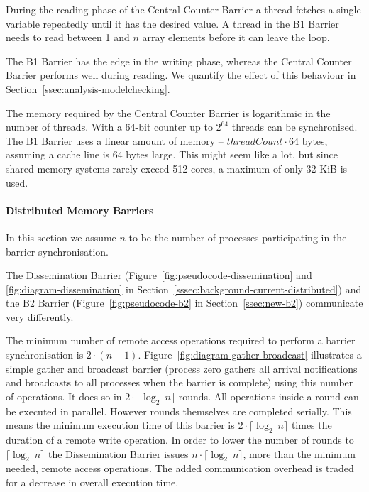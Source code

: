 \documentclass[a4paper, 10pt]{article}
\begin{document}
During the reading phase of the Central Counter Barrier a thread fetches a single variable repeatedly until it has the desired value. A thread in the B1 Barrier needs to read between 1 and $n$ array elements before it can leave the loop.

The B1 Barrier has the edge in the writing phase, whereas the Central Counter Barrier performs well during reading. We quantify the effect of this behaviour in Section~\ref{ssec:analysis-modelchecking}.

The memory required by the Central Counter Barrier is logarithmic in the number of threads. With a 64-bit counter up to $2^{64}$ threads can be synchronised. The B1 Barrier uses a linear amount of memory -- $\mathit{threadCount} \cdot 64$ bytes, assuming a cache line is 64 bytes large. This might seem like a lot, but since shared memory systems rarely exceed 512 cores, a maximum of only 32 KiB is used.

\paragraph{Distributed Memory Barriers}
\label{sssec:analysis-general-distributed}
In this section we assume $n$ to be the number of processes participating in the barrier synchronisation.

The Dissemination Barrier (Figure~\ref{fig:pseudocode-dissemination} and \ref{fig:diagram-dissemination} in Section~\ref{sssec:background-current-distributed}) and the B2 Barrier (Figure~\ref{fig:pseudocode-b2} in Section~\ref{ssec:new-b2}) communicate very differently.

The minimum number of remote access operations required to perform a barrier synchronisation is $2 \cdot (n-1)$. Figure~\ref{fig:diagram-gather-broadcast} illustrates a simple gather and broadcast  barrier (process zero gathers all arrival notifications and broadcasts to all processes when the barrier is complete) using this number of operations. It does so in $2 \cdot  \lceil \log _2~n \rceil$ rounds. All operations inside a round can be executed in parallel. However rounds themselves are completed serially. This means the minimum execution time of this  barrier is $2 \cdot \lceil \log_2~n \rceil$ times the duration of a remote write operation. In order to lower the number of rounds to $\lceil \log _2~n \rceil$ the Dissemination Barrier issues $n \cdot \lceil \log _2~n \rceil$, more than the minimum needed, remote access operations. The added communication overhead is traded for a decrease in overall execution time.
\end{document}
